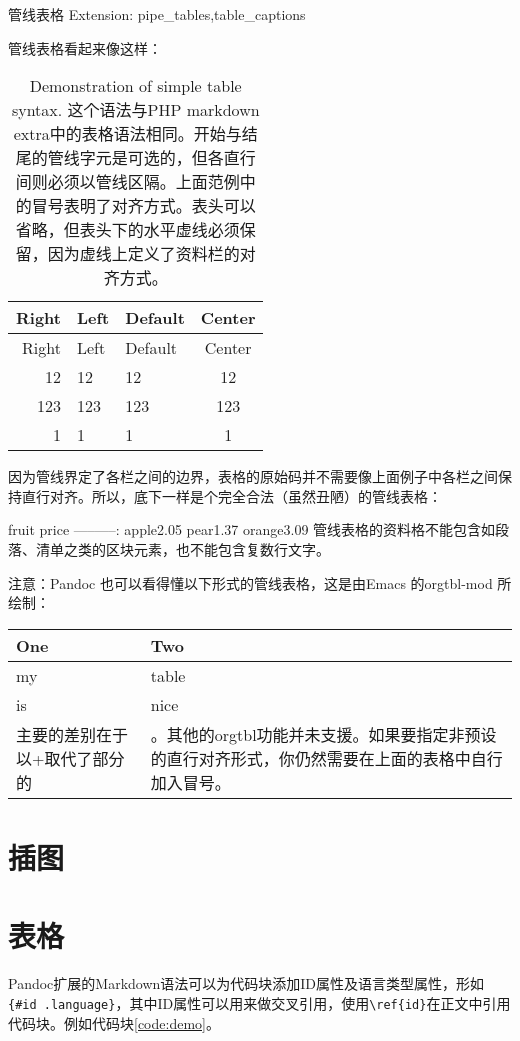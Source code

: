 \documentclass[fancyhdr,bookmark]{ctexbook}
\begin{document}
管线表格 Extension: pipe\_tables,table\_captions

管线表格看起来像这样：

\begin{longtable}[c]{@{}rllc@{}}
\caption{Demonstration of simple table syntax. 这个语法与PHP markdown
extra中的表格语法相同。开始与结尾的管线字元是可选的，但各直行间则必须以管线区隔。上面范例中的冒号表明了对齐方式。表头可以省略，但表头下的水平虚线必须保留，因为虚线上定义了资料栏的对齐方式。}\tabularnewline
\toprule
Right & Left & Default & Center\tabularnewline
\midrule
\endfirsthead
\toprule
Right & Left & Default & Center\tabularnewline
\midrule
\endhead
12 & 12 & 12 & 12\tabularnewline
123 & 123 & 123 & 123\tabularnewline
1 & 1 & 1 & 1\tabularnewline
\bottomrule
\end{longtable}

因为管线界定了各栏之间的边界，表格的原始码并不需要像上面例子中各栏之间保持直行对齐。所以，底下一样是个完全合法（虽然丑陋）的管线表格：

fruit\textbar{} price -----\textbar{}-----: apple\textbar{}2.05
pear\textbar{}1.37 orange\textbar{}3.09
管线表格的资料格不能包含如段落、清单之类的区块元素，也不能包含复数行文字。

注意：Pandoc 也可以看得懂以下形式的管线表格，这是由Emacs 的orgtbl-mod
所绘制：

\begin{longtable}[c]{@{}ll@{}}
\toprule
One & Two\tabularnewline
\midrule
\endhead
my & table\tabularnewline
is & nice\tabularnewline
主要的差别在于以+取代了部分的 &
。其他的orgtbl功能并未支援。如果要指定非预设的直行对齐形式，你仍然需要在上面的表格中自行加入冒号。\tabularnewline
\bottomrule
\end{longtable}

\section{插图}\label{ux63d2ux56fe}

\section{表格}\label{ux8868ux683c-1}

Pandoc扩展的Markdown语法可以为代码块添加ID属性及语言类型属性，形如\lstinline!{#id .language}!，其中ID属性可以用来做交叉引用，使用\lstinline!\ref{id}!在正文中引用代码块。例如代码块\ref{code:demo}。

\backmatter
\end{document}
